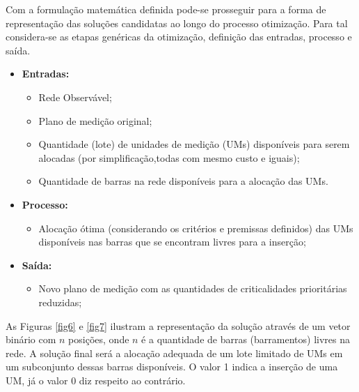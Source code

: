 \documentclass[12pt]{article}
\begin{document}
Com a formulação matemática definida pode-se prosseguir para a forma de representação das soluções candidatas ao longo do processo otimização.  Para tal considera-se as etapas genéricas da otimização, definição das entradas, processo e saída.

 \begin{itemize}
 	\item \textbf{Entradas:}
 	\begin{itemize}
 	\item Rede Observável;
 	\item Plano de medição original;
 	\item Quantidade (lote) de unidades de medição (UMs) disponíveis para serem alocadas (por simplificação,todas com mesmo custo e iguais);
 	\item Quantidade de barras na rede disponíveis para a alocação das UMs.
 	\end{itemize}
 \end{itemize}

 \begin{itemize}
	\item \textbf{Processo:}
	\begin{itemize}
		\item Alocação ótima (considerando os critérios e premissas definidos) das UMs disponíveis nas barras que se encontram livres para a inserção;
	\end{itemize}
\end{itemize}


\begin{itemize}
	\item \textbf{Saída:}
	\begin{itemize}
		\item Novo plano de medição com as quantidades de criticalidades prioritárias reduzidas;
	\end{itemize}
\end{itemize}

As Figuras \ref{fig6} e \ref{fig7} ilustram a representação da solução através de um vetor binário com $n$ posições, onde $n$ é a quantidade de barras (barramentos) livres na rede. A solução final será a alocação adequada de um lote limitado de UMs em um subconjunto dessas barras disponíveis. O valor 1 indica a inserção de uma UM, já o valor 0 diz respeito ao contrário.
\end{document}
